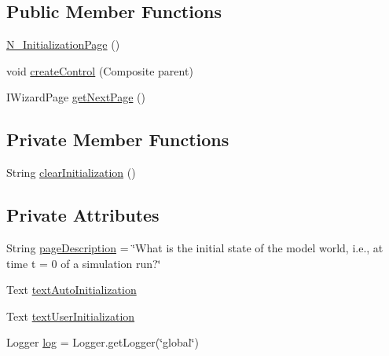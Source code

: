 \subsection*{Public Member Functions}
\begin{DoxyCompactItemize}
\item 
\hyperlink{classit_1_1isislab_1_1masonhelperdocumentation_1_1mason_1_1wizards_1_1_n___initialization_page_a1d38683c39d689be1bf3640256ef2216}{N\-\_\-\-Initialization\-Page} ()
\item 
void \hyperlink{classit_1_1isislab_1_1masonhelperdocumentation_1_1mason_1_1wizards_1_1_n___initialization_page_ad6cf70161dc68f1e8d876c719fc291b8}{create\-Control} (Composite parent)
\item 
I\-Wizard\-Page \hyperlink{classit_1_1isislab_1_1masonhelperdocumentation_1_1mason_1_1wizards_1_1_n___initialization_page_a60077cbf9275e6183e51d30e51767b47}{get\-Next\-Page} ()
\end{DoxyCompactItemize}
\subsection*{Private Member Functions}
\begin{DoxyCompactItemize}
\item 
String \hyperlink{classit_1_1isislab_1_1masonhelperdocumentation_1_1mason_1_1wizards_1_1_n___initialization_page_a2bb3efb58a0a5af6cf525be924dfb6ef}{clear\-Initialization} ()
\end{DoxyCompactItemize}
\subsection*{Private Attributes}
\begin{DoxyCompactItemize}
\item 
String \hyperlink{classit_1_1isislab_1_1masonhelperdocumentation_1_1mason_1_1wizards_1_1_n___initialization_page_ac351c971f8c57b31219beea5f032820e}{page\-Description} = \char`\"{}What is the initial state of the model world, i.\-e., at time t = 0 of a simulation run?\char`\"{}
\item 
Text \hyperlink{classit_1_1isislab_1_1masonhelperdocumentation_1_1mason_1_1wizards_1_1_n___initialization_page_a839ed55d6a19462f54d279cb70a0573f}{text\-Auto\-Initialization}
\item 
Text \hyperlink{classit_1_1isislab_1_1masonhelperdocumentation_1_1mason_1_1wizards_1_1_n___initialization_page_a331a3a5f20079206c74fce5e702d2e2c}{text\-User\-Initialization}
\item 
Logger \hyperlink{classit_1_1isislab_1_1masonhelperdocumentation_1_1mason_1_1wizards_1_1_n___initialization_page_a54f81e8dbd04e0d2b7d260ccfe511eaf}{log} = Logger.\-get\-Logger(\char`\"{}global\char`\"{})
\end{DoxyCompactItemize}


